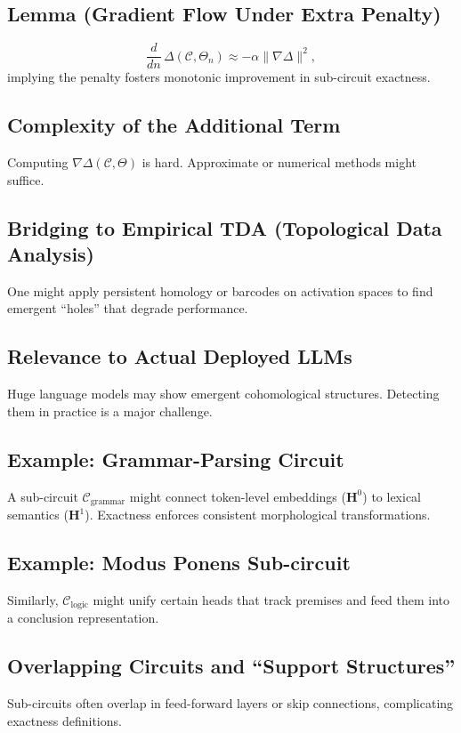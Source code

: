 \documentclass{article}
\begin{document}
\subsection{Lemma (Gradient Flow Under Extra Penalty)}
\[
\frac{d}{dn}\,\Delta(\mathcal{C}, \Theta_n) \approx -\alpha \|\nabla \Delta\|^2,
\]
implying the penalty fosters monotonic improvement in sub-circuit exactness.

\subsection{Complexity of the Additional Term}
Computing $\nabla \Delta(\mathcal{C}, \Theta)$ is hard. Approximate or numerical methods might suffice.

\subsection{Bridging to Empirical TDA (Topological Data Analysis)}
One might apply persistent homology or barcodes on activation spaces to find emergent “holes” that degrade performance.

\subsection{Relevance to Actual Deployed LLMs}
Huge language models may show emergent cohomological structures. Detecting them in practice is a major challenge.

\subsection{Example: Grammar-Parsing Circuit}
A sub-circuit $\mathcal{C}_{\mathrm{grammar}}$ might connect token-level embeddings ($\mathbf{H}^0$) to lexical semantics ($\mathbf{H}^1$). Exactness enforces consistent morphological transformations.

\subsection{Example: Modus Ponens Sub-circuit}
Similarly, $\mathcal{C}_{\mathrm{logic}}$ might unify certain heads that track premises and feed them into a conclusion representation.

\subsection{Overlapping Circuits and “Support Structures”}
Sub-circuits often overlap in feed-forward layers or skip connections, complicating exactness definitions.
\end{document}
